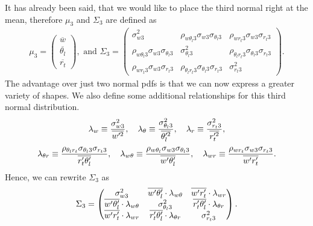 It has already been said,
that we would like to place the third normal right at the mean,
therefore $\mu_3$ and $\Sigma_3$ are defined as
\begin{align}
	\mu_3 =
	\begin{pmatrix}
		\overline{w}        \\
		\overline{\theta_l} \\
		\overline{r_t}
	\end{pmatrix},
	\text{ and }
	\Sigma_3 =
	\begin{pmatrix}
		\sigma_{w 3}^2 &
		\rho_{w \theta_l 3} \sigma_{w 3} \sigma_{\theta_l 3} &
		\rho_{w r_t 3} \sigma_{w 3} \sigma_{r_t 3} \\
		\rho_{w \theta_l 3} \sigma_{w 3} \sigma_{\theta_l 3} &
		\sigma_{\theta_l 3}^2 &
		\rho_{\theta_l r_t 3} \sigma_{\theta_l 3} \sigma_{r_t 3} \\
		\rho_{w r_t 3} \sigma_{w 3} \sigma_{r_t 3} &
		\rho_{\theta_l r_t 3} \sigma_{\theta_l 3} \sigma_{r_t 3} &
		\sigma_{r_t 3}^2
	\end{pmatrix}.
\end{align}
The advantage over just two normal \glspl{pdf} is that
we can now express a greater variety of shapes.
We also define some additional relationships for this third normal distribution.
\begin{align}
	\label{eq:lambda}
	\lambda_w \equiv \frac{\sigma_{w 3}^2}{\overline{w'^2}}, \quad
	\lambda_\theta \equiv \frac{\sigma_{\theta_l 3}^2}{\overline{\theta_l'^2}}, \quad
	\lambda_r \equiv \frac{\sigma_{r_t 3}^2}{\overline{r_t'^2}},
\end{align}
\begin{align}
	\label{eq:lambda_two}
	\lambda_{\theta r} \equiv
	\frac{\rho_{\theta_l r_t} \sigma_{\theta_l 3} \sigma_{r_t 3}}{\overline{r_t' \theta_l'}}, \quad
	\lambda_{w \theta} \equiv
	\frac{\rho_{w \theta_l} \sigma_{w 3} \sigma_{\theta_l 3}}{\overline{w' \theta_l'}}, \quad
	\lambda_{w r} \equiv
	\frac{\rho_{w r_t} \sigma_{w 3} \sigma_{r_t 3}}{\overline{w' r_t'}}.
\end{align}
Hence, we can rewrite $\Sigma_3$ as
\begin{align}
	\Sigma_3 =
	\begin{pmatrix}
		\sigma_{w 3}^2 &
		\overline{w' \theta_l'} \cdot \lambda_{w \theta} &
		\overline{w' r_t'} \cdot \lambda_{w r} \\
		\overline{w' \theta_l'} \cdot \lambda_{w \theta} &
		\sigma_{\theta_l 3}^2 &
		\overline{r_t' \theta_l'} \cdot \lambda_{\theta r} \\
		\overline{w' r_t'} \cdot \lambda_{w r} &
		\overline{r_t' \theta_l'} \cdot \lambda_{\theta r} &
		\sigma_{r_t 3}^2
	\end{pmatrix}.
\end{align}